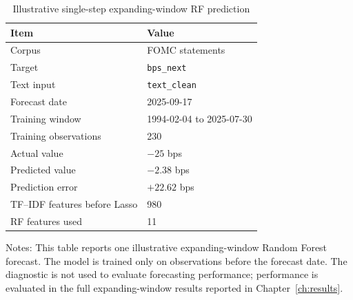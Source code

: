 \begin{table}[H]
\centering
\caption{Illustrative single-step expanding-window RF prediction}
\label{tab:rf_single_xw_prediction}
\begin{threeparttable}
\small
\begin{tabular}{ll}
\toprule
Item & Value \\
\midrule
Corpus & FOMC statements \\
Target & \texttt{bps\_next} \\
Text input & \texttt{text\_clean} \\
Forecast date & 2025-09-17 \\
Training window & 1994-02-04 to 2025-07-30 \\
Training observations & 230 \\
Actual value & $-25$ bps \\
Predicted value & $-2.38$ bps \\
Prediction error & $+22.62$ bps \\
TF--IDF features before Lasso & 980 \\
RF features used & 11 \\
\bottomrule
\end{tabular}
\begin{tablenotes}[flushleft]
\footnotesize
\item Notes: This table reports one illustrative expanding-window Random Forest
forecast. The model is trained only on observations before the forecast date.
The diagnostic is not used to evaluate forecasting performance; performance is
evaluated in the full expanding-window results reported in Chapter~\ref{ch:results}.
\end{tablenotes}
\end{threeparttable}
\end{table}

